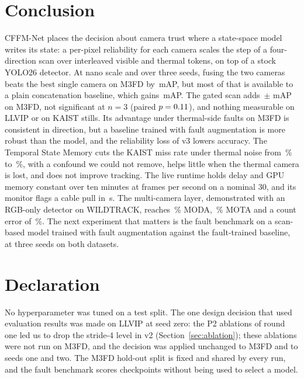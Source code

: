 \section{Conclusion}
\label{sec:conclusion}
CFFM-Net places the decision about camera trust where a state-space model writes its state: a per-pixel reliability for each camera scales the step of a four-direction scan over interleaved visible and thermal tokens, on top of a stock YOLO26 detector. At nano scale and over three seeds, fusing the two cameras beats the best single camera on M3FD by \gainMfdCffmVtwoOverBestMeanMap{}\,mAP, but most of that is available to a plain concatenation baseline, which gains \gainMfdConcatMdOverBestMeanMap{}\,mAP. The gated scan adds \marMfdVtwoVsConcatMdMeanMap{}\,$\pm$\,\marMfdVtwoVsConcatMdStdMap{}\,mAP on M3FD, not significant at $n=3$ (paired $p=0.11{}$), and nothing measurable on LLVIP or on KAIST stills. Its advantage under thermal-side faults on M3FD is consistent in direction, but a baseline trained with fault augmentation is more robust than the model, and the reliability loss of v3 lowers accuracy. The Temporal State Memory cuts the KAIST miss rate under thermal noise from \memThermalNoiseImageAllMr{}\,\% to \memThermalNoiseMemoryAllMr{}\,\%, with a confound we could not remove, helps little when the thermal camera is lost, and does not improve tracking. The live runtime holds delay and GPU memory constant over ten minutes at \livSoakThirtyFps{} frames per second on a nominal 30, and its monitor flags a cable pull in \livFaultOnUnpluggedDetectS{}\,s. The multi-camera layer, demonstrated with an RGB-only detector on WILDTRACK, reaches \camDetFineTunedModa{}\,\% MODA, \camTrackMota{}\,\% MOTA and a count error of \camCountRelErr{}\,\%. The next experiment that matters is the fault benchmark on a scan-based model trained with fault augmentation against the fault-trained baseline, at three seeds on both datasets.

\section*{Declaration}
No hyperparameter was tuned on a test split. The one design decision that used evaluation results was made on LLVIP at seed zero: the P2 ablations of round one led us to drop the stride-4 level in v2 (Section~\ref{sec:ablation}); these ablations were not run on M3FD, and the decision was applied unchanged to M3FD and to seeds one and two. The M3FD hold-out split is fixed and shared by every run, and the fault benchmark scores checkpoints without being used to select a model.

